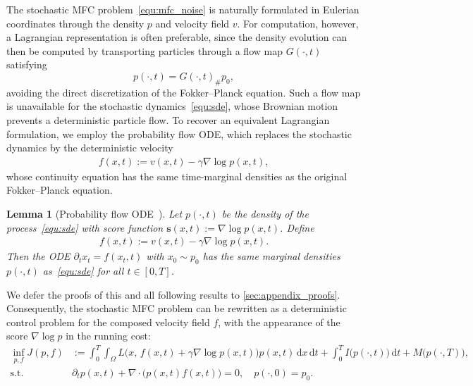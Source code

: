 \documentclass[preprint]{elsarticle}
\newtheorem{lemma}[theorem]{Lemma}
\newcommand{\dd}{\,\mathrm{d}}          %
\newcommand{\qb}[1]{\bigl(#1\bigr)}          %
\newcommand{\g}{\gamma}
\newcommand{\Om}{\Omega}
\begin{document}
The stochastic MFC problem~\eqref{equ:mfc_noise} is naturally formulated in Eulerian coordinates through the density $p$ and velocity field $v$. For computation, however, a Lagrangian representation is often preferable, since the density evolution can then be computed by transporting particles through a flow map $G(\cdot,t)$ satisfying
\[
p(\cdot,t)=G(\cdot,t)_\#p_0,
\]
avoiding the direct discretization of the Fokker--Planck equation. Such a flow map is unavailable for the stochastic dynamics~\eqref{equ:sde}, whose Brownian motion prevents a deterministic particle flow. To recover an equivalent Lagrangian formulation, we employ the probability flow ODE, which replaces the stochastic dynamics by the deterministic velocity
\begin{align}
    f(x,t):=v(x,t)-\g\nabla\log p(x,t),
\end{align}
whose continuity equation has the same time-marginal densities as the original Fokker--Planck equation.

\begin{lemma}[Probability flow ODE~\cite{anderson1982reverse}]%
\label{lem:prob_flow}
Let $p(\cdot,t)$ be the density of the process~\eqref{equ:sde} with score function $\mathbf{s}(x,t):=\nabla\log p(x,t)$. Define
\begin{align}
    f(x,t) := v(x,t) - \g \nabla\log p(x,t). \label{equ:prob_flow_f}
\end{align}
Then the ODE $\partial_t x_t = f(x_t,t)$ with $x_0\sim p_0$ has the same marginal densities $p(\cdot,t)$ as~\eqref{equ:sde} for all $t\in[0,T]$.
\end{lemma}
We defer the proofs of this and all following results to \ref{sec:appendix_proofs}. Consequently, the stochastic MFC problem can be rewritten as a deterministic control problem for the composed velocity field $f$, with the appearance of the score $\nabla\log p$ in the running cost:
\begin{align}
    \inf_{p,f}  J(p,f)
    &:= \int_0^T\!\int_\Om
        L\qb{x,\, f(x,t)+\g\nabla\log p(x,t)}
    p(x,t)\dd x\dd t
    + \int_0^T I\qb{p(\cdot,t)}\dd t
    + M\qb{p(\cdot,T)},
    \label{equ:mfc_det}
    \\
    \text{s.t.}\quad&
    \partial_t p(x,t) + \nabla\!\cdot\!\qb{p(x,t)f(x,t)} = 0,\quad p(\cdot,0)=p_0.
    \nonumber
\end{align}
\end{document}
